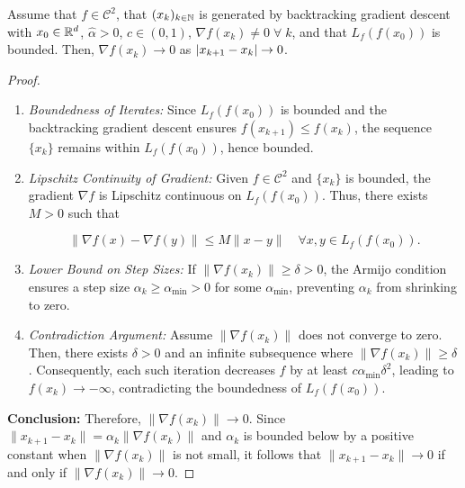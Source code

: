 \begin{theorem}{}{}
    Assume that  \(f \in \mathcal{C}^2\), that  \((x_k)_{k \in \mathbb{N}}\)
    is generated by backtracking gradient descent with
     \(x_0 \in \mathbb{R}^d\),  \(\hat{\alpha} > 0\), \(c \in (0, 1)\),  \(\nabla f(x_k) \neq 0 \; \forall \; k\), and that
     \(L_f(f(x_0))\) is bounded. Then,  \(\nabla f(x_k) \to 0\) as  \(\lvert x_{k+1} - x_k\rvert \to 0\).
\end{theorem}

\begin{proof}{}{}
    \begin{enumerate}
        \item \textit{Boundedness of Iterates:} Since  \(L_f(f(x_0))\) is bounded and the backtracking gradient descent ensures  \(f(x_{k+1}) \leq f(x_k)\), the sequence  \(\{x_k\}\) remains within  \(L_f(f(x_0))\), hence bounded.
        \item \textit{Lipschitz Continuity of Gradient:} Given  \(f \in \mathcal{C}^2\) and  \(\{x_k\}\) is bounded, the gradient  \(\nabla f\) is Lipschitz continuous on  \(L_f(f(x_0))\). Thus, there exists  \(M > 0\) such that

              \[
                  \|\nabla f(x) - \nabla f(y)\| \leq M \|x - y\| \quad \forall x, y \in L_f(f(x_0)).
              \]

        \item \textit{Lower Bound on Step Sizes:} If  \(\|\nabla f(x_k)\| \geq \delta > 0\), the Armijo condition ensures a step size  \(\alpha_k \geq \alpha_{\min} > 0\) for some  \(\alpha_{\min}\), preventing  \(\alpha_k\) from shrinking to zero.
        \item \textit{Contradiction Argument:} Assume  \(\|\nabla f(x_k)\|\) does not converge to zero. Then, there exists  \(\delta > 0\) and an infinite subsequence where  \(\|\nabla f(x_k)\| \geq \delta\). Consequently, each such iteration decreases  \(f\) by at least  \(c \alpha_{\min} \delta^2\), leading to  \(f(x_k) \to -\infty\), contradicting the boundedness of  \(L_f(f(x_0))\).
    \end{enumerate}

    \textbf{Conclusion:} Therefore,  \(\|\nabla f(x_k)\| \to 0\). Since  \(\|x_{k+1} - x_k\| = \alpha_k \|\nabla f(x_k)\|\) and  \(\alpha_k\) is bounded below by a positive constant when  \(\|\nabla f(x_k)\|\) is not small, it follows that  \(\|x_{k+1} - x_k\| \to 0\) if and only if  \(\|\nabla f(x_k)\| \to 0\).

\end{proof}

